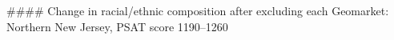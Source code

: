 #### Change in racial/ethnic composition after excluding each Geomarket: Northern New Jersey, PSAT score 1190–1260

